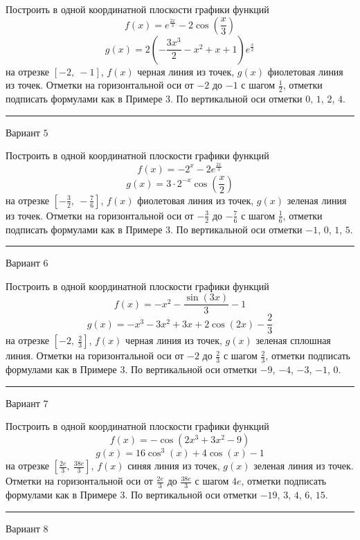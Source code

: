 \documentclass[11pt]{report}
\begin{document}
Построить в одной координатной плоскости графики функций $$f(x) = e^{\frac{2 x}{3}} - 2 \cos{\left(\frac{x}{3} \right)}$$ $$g(x) = 2 \left(- \frac{3 x^{3}}{2} - x^{2} + x + 1\right) e^{\frac{x}{2}}$$ на отрезке $\left[-2, \  -1\right]$, $f(x)$ черная линия из точек, $g(x)$ фиолетовая линия из точек. Отметки на горизонтальной оси от $-2$ до $-1$ с шагом $\frac{1}{2}$, отметки подписать формулами как в Примере 3. По вертикальной оси отметки $0$, $1$, $2$, $4$.
\begin{center}
\noindent\rule{8cm}{0.4pt}
\end{center}
Вариант $5$


Построить в одной координатной плоскости графики функций $$f(x) = - 2^{x} - 2 e^{\frac{2 x}{3}}$$ $$g(x) = 3 \cdot 2^{- x} \cos{\left(\frac{x}{2} \right)}$$ на отрезке $\left[- \frac{3}{2}, \  - \frac{7}{6}\right]$, $f(x)$ фиолетовая линия из точек, $g(x)$ зеленая линия из точек. Отметки на горизонтальной оси от $- \frac{3}{2}$ до $- \frac{7}{6}$ с шагом $\frac{1}{6}$, отметки подписать формулами как в Примере 3. По вертикальной оси отметки $-1$, $0$, $1$, $5$.
\begin{center}
\noindent\rule{8cm}{0.4pt}
\end{center}
Вариант $6$


Построить в одной координатной плоскости графики функций $$f(x) = - x^{2} - \frac{\sin{\left(3 x \right)}}{3} - 1$$ $$g(x) = - x^{3} - 3 x^{2} + 3 x + 2 \cos{\left(2 x \right)} - \frac{2}{3}$$ на отрезке $\left[-2, \  \frac{2}{3}\right]$, $f(x)$ черная линия из точек, $g(x)$ зеленая сплошная линия. Отметки на горизонтальной оси от $-2$ до $\frac{2}{3}$ с шагом $\frac{2}{3}$, отметки подписать формулами как в Примере 3. По вертикальной оси отметки $-9$, $-4$, $-3$, $-1$, $0$.
\begin{center}
\noindent\rule{8cm}{0.4pt}
\end{center}
Вариант $7$


Построить в одной координатной плоскости графики функций $$f(x) = - \cos{\left(2 x^{3} + 3 x^{2} - 9 \right)}$$ $$g(x) = 16 \cos^{3}{\left(x \right)} + 4 \cos{\left(x \right)} - 1$$ на отрезке $\left[\frac{2 e}{3}, \  \frac{38 e}{3}\right]$, $f(x)$ синяя линия из точек, $g(x)$ зеленая линия из точек. Отметки на горизонтальной оси от $\frac{2 e}{3}$ до $\frac{38 e}{3}$ с шагом $4 e$, отметки подписать формулами как в Примере 3. По вертикальной оси отметки $-19$, $3$, $4$, $6$, $15$.
\begin{center}
\noindent\rule{8cm}{0.4pt}
\end{center}
Вариант $8$
\end{document}

